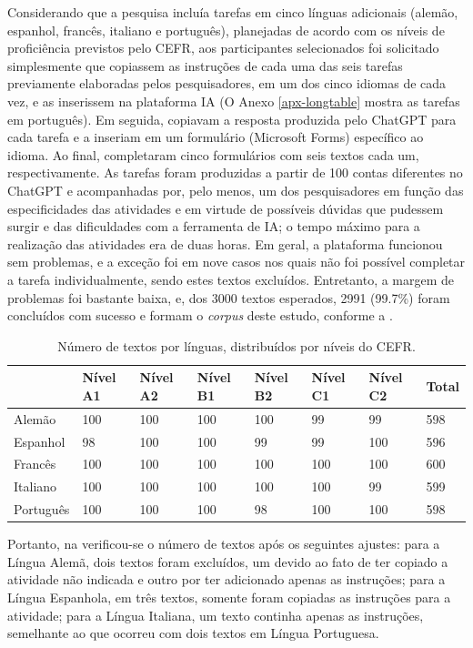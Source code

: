 \documentclass[portuguese]{textolivre}
\begin{document}
Considerando que a pesquisa incluía tarefas em cinco línguas adicionais (alemão, espanhol, francês, italiano e português), planejadas de acordo com os níveis de proficiência previstos pelo CEFR, aos participantes selecionados foi solicitado simplesmente que copiassem as instruções de cada uma das seis tarefas previamente elaboradas pelos pesquisadores, em um dos cinco idiomas de cada vez, e as inserissem na plataforma IA (O Anexo \ref{apx-longtable} mostra as tarefas em português). Em seguida, copiavam a resposta produzida pelo ChatGPT para cada tarefa e a inseriam em um formulário (Microsoft Forms) específico ao idioma. Ao final, completaram cinco formulários com seis textos cada um, respectivamente. As tarefas foram produzidas a partir de 100 contas diferentes no ChatGPT e acompanhadas por, pelo menos, um dos pesquisadores em função das especificidades das atividades e em virtude de possíveis dúvidas que pudessem surgir e das dificuldades com a ferramenta de IA; o tempo máximo para a realização das atividades era de duas horas. Em geral, a plataforma funcionou sem problemas, e a exceção foi em nove casos nos quais não foi possível completar a tarefa individualmente, sendo estes textos excluídos. Entretanto, a margem de problemas foi bastante baixa, e, dos 3000 textos esperados, 2991 (99.7\%) foram concluídos com sucesso e formam o \textit{corpus} deste estudo, conforme a .

\begin{table}[h!]
\centering
\begin{threeparttable}
\caption{Número de textos por línguas, distribuídos por níveis do CEFR.}
\label{tab01}
\begin{tabular}{l l l l l l l l}
\toprule
& Nível A1 & Nível A2 & Nível B1 & Nível B2 & Nível C1 & Nível C2 & Total \\
 \midrule
Alemão & 100 & 100 & 100 & 100 & 99 & 99 & 598 \\
Espanhol & 98 & 100 & 100 & 99 & 99 & 100 & 596 \\
Francês & 100 & 100 & 100 & 100 & 100 & 100 & 600 \\
Italiano & 100 & 100 & 100 & 100 & 100 & 99 & 599 \\
Português & 100 & 100 & 100 & 98 & 100 & 100 & 598 \\
\bottomrule
\end{tabular}
\end{threeparttable}
\end{table}

Portanto, na  verificou-se o número de textos após os seguintes ajustes: para a Língua Alemã, dois textos foram excluídos, um devido ao fato de ter copiado a atividade não indicada e outro por ter adicionado apenas as instruções; para a Língua Espanhola, em três textos, somente foram copiadas as instruções para a atividade; para a Língua Italiana, um texto continha apenas as instruções, semelhante ao que ocorreu com dois textos em Língua Portuguesa.
\end{document}
